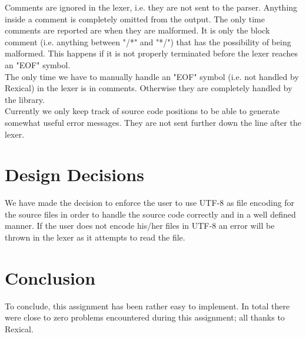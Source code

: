 \noindent
Comments are ignored in the lexer, i.e. they are not sent to the parser. Anything inside a comment is completely omitted from the output. The only time comments are reported are when they are malformed. It is only the block comment (i.e. anything between "/*" and "*/") that has the possibility of being malformed. This happens if it is not properly terminated before the lexer reaches an "EOF" symbol.\\

\noindent
The only time we have to manually handle an "EOF" symbol (i.e. not handled by Rexical) in the lexer is in comments. Otherwise they are completely handled by the library.\\

\noindent
Currently we only keep track of source code positions to be able to generate somewhat useful error messages. They are not sent further down the line after the lexer.

\section{Design Decisions}
We have made the decision to enforce the user to use UTF-8 as file encoding for the source files in order to handle the source code correctly and in a well defined manner. If the user does not encode his/her files in UTF-8 an error will be thrown in the lexer as it attempts to read the file.

\section{Conclusion}
To conclude, this assignment has been rather easy to implement. In total there were close to zero problems encountered during this assignment; all thanks to Rexical.
